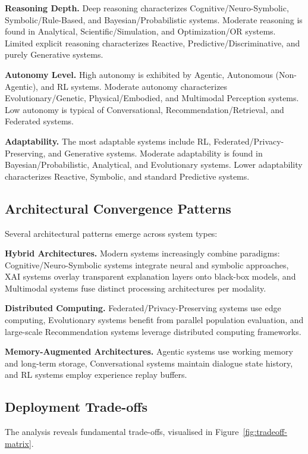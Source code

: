 \documentclass[acmsmall,screen,review]{acmart}
\begin{document}
\textbf{Reasoning Depth.} Deep reasoning characterizes Cognitive/Neuro-Symbolic, Symbolic/Rule-Based, and Bayesian/Probabilistic systems. Moderate reasoning is found in Analytical, Scientific/Simulation, and Optimization/OR systems. Limited explicit reasoning characterizes Reactive, Predictive/Discriminative, and purely Generative systems.

\textbf{Autonomy Level.} High autonomy is exhibited by Agentic, Autonomous (Non-Agentic), and RL systems. Moderate autonomy characterizes Evolutionary/Genetic, Physical/Embodied, and Multimodal Perception systems. Low autonomy is typical of Conversational, Recommendation/Retrieval, and Federated systems.

\textbf{Adaptability.} The most adaptable systems include RL, Federated/Privacy-Preserving, and Generative systems. Moderate adaptability is found in Bayesian/Probabilistic, Analytical, and Evolutionary systems. Lower adaptability characterizes Reactive, Symbolic, and standard Predictive systems.

\subsection{Architectural Convergence Patterns}

Several architectural patterns emerge across system types:

\textbf{Hybrid Architectures.} Modern systems increasingly combine paradigms: Cognitive/Neuro-Symbolic systems integrate neural and symbolic approaches, XAI systems overlay transparent explanation layers onto black-box models, and Multimodal systems fuse distinct processing architectures per modality.

\textbf{Distributed Computing.} Federated/Privacy-Preserving systems use edge computing, Evolutionary systems benefit from parallel population evaluation, and large-scale Recommendation systems leverage distributed computing frameworks.

\textbf{Memory-Augmented Architectures.} Agentic systems use working memory and long-term storage, Conversational systems maintain dialogue state history, and RL systems employ experience replay buffers.

\subsection{Deployment Trade-offs}
The analysis reveals fundamental trade-offs, visualised in Figure~\ref{fig:tradeoff-matrix}.
\end{document}
